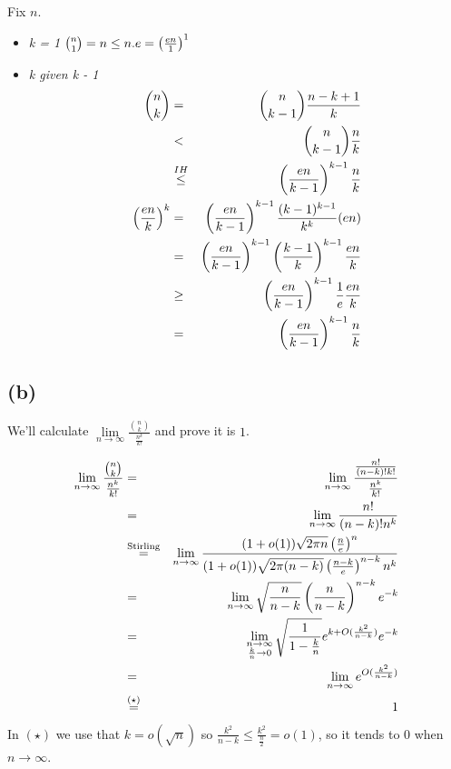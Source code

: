 \documentclass[a4paper]{article}
\begin{document}
  Fix $ n $.
  \begin{itemize}
    \item \em k = 1 \em\quad $ \binom{n}{1} = n \le  n.e = \left(\frac{en}{1}\right)^1 $ \\
    \item \em k \em given \em k - 1 \em \\
    \begin{eqnarray*}
      \binom{n}{k} &=& \binom{n}{k-1} \frac{n-k+1}{k} \\
                   &<& \binom{n}{k-1} \frac{n}{k} \\
                   &\overset{IH}{\le}& \left(\frac{en}{k-1}\right)^{k-1} \frac{n}{k} \\
      \left(\frac{en}{k}\right)^k &=& \left(\frac{en}{k-1}\right)^{k-1} \frac{(k-1)^{k-1}}{k^k}(en) \\
                      &=& \left(\frac{en}{k-1}\right)^{k-1} \left(\frac{k-1}{k}\right)^{k-1} \frac{en}{k} \\
                      &\ge& \left(\frac{en}{k-1}\right)^{k-1} \frac{1}{e} \frac{en}{k} \\
                      &=& \left(\frac{en}{k-1}\right)^{k-1} \frac{n}{k}
    \end{eqnarray*}
  \end{itemize}
  \subsection*{(b)}

  We'll calculate $ \underset{n\to\infty}\lim
  \frac{\binom{n}{k}}{\frac{n^k}{k!}} $ and prove it is $ 1 $.

  \begin{eqnarray*}
    \lim_{n\to\infty} \frac{\binom{n}{k}}{\frac{n^k}{k!}}
      &=& \lim_{n\to\infty} \frac{\frac{n!}{(n-k)!k!}}{\frac{n^k}{k!}} \\
      &=& \lim_{n\to\infty} \frac{n!}{(n-k)!n^k} \\
      &\overset{\mathrm{Stirling}}{=}&
          \lim_{n\to\infty} \frac{(1 + o(1)) \sqrt{2\pi n} \left(\frac{n}{e}\right)^n}
                                 {(1 + o(1)) \sqrt{2\pi(n-k)} \left(\frac{n-k}{e}\right)^{n-k} n^k} \\
      &=& \lim_{n\to\infty} \sqrt{\frac{n}{n-k}} \left(\frac{n}{n-k}\right)^{n-k} e^{-k} \\
      &=& \lim_{\substack{n\to\infty\\ \frac{k}{n} \to 0}}
                            \sqrt{\frac{1}{1-\frac{k}{n}}} e^{k+O(\frac{k^2}{n-k})} e^{-k} \\
      &=& \lim_{n\to\infty} e^{O(\frac{k^2}{n-k})} \\
      &\overset{(\star)}{=}& 1
  \end{eqnarray*}
  In $ (\star) $ we use that $ k = o(\sqrt{n}) $ so $ \frac{k^2}{n-k} \le \frac{k^2}{\frac{n}{2}} = o(1) $,
  so it tends to $ 0 $ when $ n \to \infty $.
  
\end{document}
